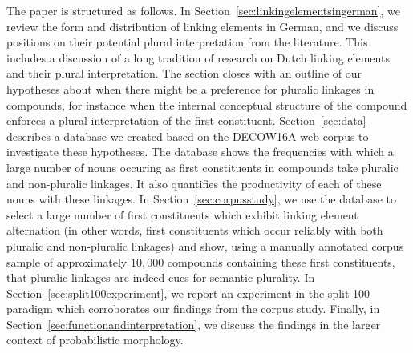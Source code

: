 The paper is structured as follows.
In Section~\ref{sec:linkingelementsingerman}, we review the form and distribution of linking elements in German, and we discuss positions on their potential plural interpretation from the literature.
This includes a discussion of a long tradition of research on Dutch linking elements and their plural interpretation.
The section closes with an outline of our hypotheses about when there might be a preference for pluralic linkages in compounds, for instance when the internal conceptual structure of the compound enforces a plural interpretation of the first constituent.
Section~\ref{sec:data} describes a database we created based on the DECOW16A web corpus to investigate these hypotheses.
The database shows the frequencies with which a large number of nouns occuring as first constituents in compounds take pluralic and non-pluralic linkages.
It also quantifies the productivity of each of these nouns with these linkages.
In Section~\ref{sec:corpusstudy}, we use the database to select a large number of first constituents which exhibit linking element alternation (in other words, first constituents which occur reliably with both pluralic and non-pluralic linkages) and show, using a manually annotated corpus sample of approximately $10,000$ compounds containing these first constituents, that pluralic linkages are indeed cues for semantic plurality.
In Section~\ref{sec:split100experiment}, we report an experiment in the split-100 paradigm which corroborates our findings from the corpus study.
Finally, in Section~\ref{sec:functionandinterpretation}, we discuss the findings in the larger context of probabilistic morphology.

